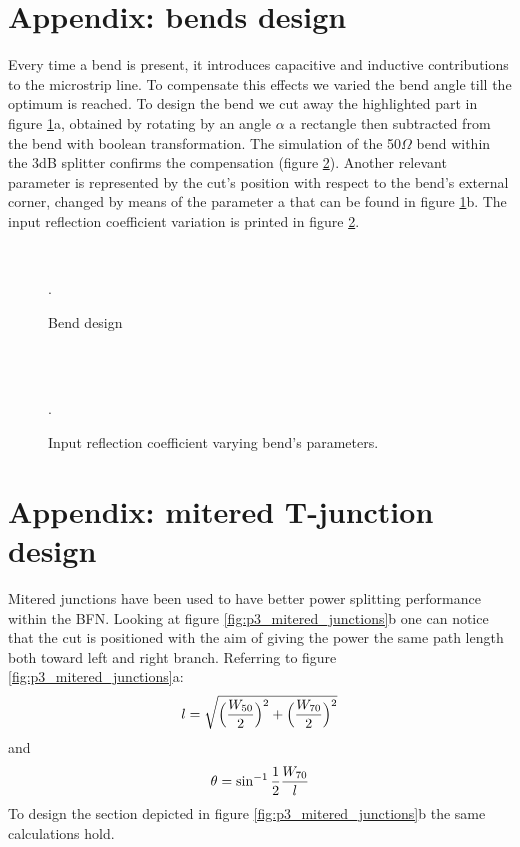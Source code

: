 \newpage 
\appendix
\section{Appendix: bends design}

Every time a bend is present, it introduces capacitive and inductive contributions to the microstrip line. To compensate this effects we varied the bend angle till the optimum is reached. To design the bend we cut away the highlighted part in figure \ref{fig:A_bend1}a, obtained by rotating by an angle $\alpha$ a rectangle then subtracted from the bend with boolean transformation. The simulation of the 50$\Omega$ bend within the 3dB splitter confirms the compensation (figure \ref{fig:A_bend}). Another relevant parameter is represented by the cut's position with respect to the bend's external corner, changed by means of the parameter a that can be found in figure \ref{fig:A_bend1}b. The input reflection coefficient variation is printed in figure \ref{fig:A_bend}. 

\begin{figure}[H] 
	\centering
	\quad
	\\
	\caption{Bend design}.
	\label{fig:A_bend1}
\end{figure}
 
 \begin{figure}[H] 
 	\centering
 	\\
 	\\
 	\caption{Input reflection coefficient varying bend's parameters.}.
 	\label{fig:A_bend}
 \end{figure}

\newpage 
\section{Appendix: mitered T-junction design}

Mitered junctions have been used to have better power splitting performance within the BFN. Looking at figure \ref{fig:p3_mitered_junctions}b one can notice that the cut is positioned with the aim of giving the power the same path length both toward left and right branch. Referring to figure \ref{fig:p3_mitered_junctions}a:
\begin{equation}
l = \sqrt{\Big(\frac{W_{50}}{2}\Big)^2+\Big(\frac{W_{70}}{2}\Big)^2} \notag
\end{equation}
and
\begin{equation}
\theta = \sin^{-1}\frac{1}{2}\frac{W_{70}}{l} \notag
\end{equation}
To design the section depicted in figure \ref{fig:p3_mitered_junctions}b the same calculations hold.

